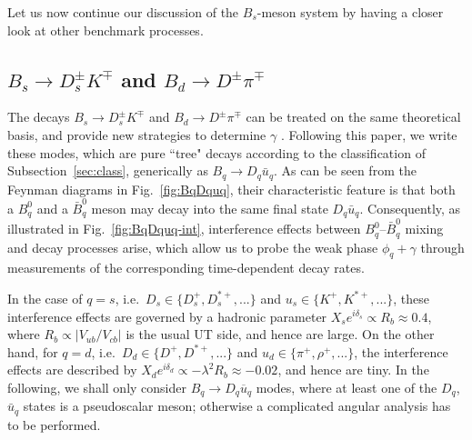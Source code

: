\documentclass[11pt]{cernrep}
\begin{document}
Let us now continue our discussion of the $B_s$-meson system by having
a closer look at other benchmark processes.


%
%
%
\boldmath
\subsection{$B_s\to D_s^\pm K^\mp$ and $B_d\to D^\pm \pi^\mp$}\label{ssec:BsDsK}
\unboldmath
%
%
%
The decays $B_s\to D_s^\pm K^\mp$ \cite{BsDsK} and $B_d\to D^\pm \pi^\mp$
\cite{BdDpi} can be 
treated on the same theoretical basis, and provide new strategies to determine 
$\gamma$ \cite{RF-gam-ca}. Following this paper, we write these modes, which 
are pure ``tree" decays according to the classification of 
Subsection~\ref{sec:class}, generically as $B_q\to D_q \bar u_q$. 
As can be seen from the Feynman diagrams in Fig.~\ref{fig:BqDquq}, their
characteristic feature is that both a $B^0_q$ and a $\bar B^0_q$ meson may decay 
into the same final state $D_q \bar u_q$. Consequently,  as illustrated in 
Fig.~\ref{fig:BqDquq-int}, interference effects between $B^0_q$--$\bar B^0_q$ 
mixing and decay processes arise, which allow us to probe the weak phase 
$\phi_q+\gamma$ through measurements of the corresponding time-dependent
decay rates. 

In the case of $q=s$, i.e.\ $D_s\in\{D_s^+, D_s^{\ast+}, ...\}$ and 
$u_s\in\{K^+, K^{\ast+}, ...\}$, these interference effects are governed 
by a hadronic parameter $X_s e^{i\delta_s}\propto R_b\approx0.4$, where
$R_b\propto |V_{ub}/V_{cb}|$ is the usual UT side, and hence are large. 
On the other hand, for $q=d$, i.e.\ $D_d\in\{D^+, D^{\ast+}, ...\}$ 
and $u_d\in\{\pi^+, \rho^+, ...\}$, the interference effects are described 
by $X_d e^{i\delta_d}\propto -\lambda^2R_b\approx-0.02$, and hence are tiny. 
In the following, we shall only consider $B_q\to D_q \overline{u}_q$ modes, 
where at least one of the $D_q$, $\bar u_q$ states is a pseudoscalar 
meson; otherwise a complicated angular analysis has to be performed.
 
\end{document}
